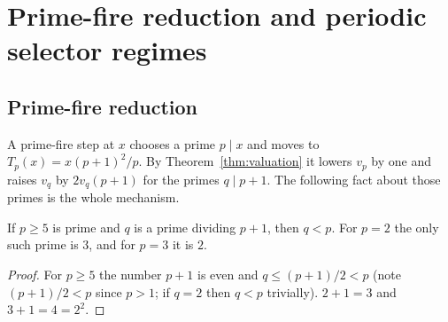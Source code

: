
\section{Prime-fire reduction and periodic selector regimes}\label{sec:fire}
\subsection{Prime-fire reduction}
A prime-fire step at $x$ chooses a prime $p\mid x$ and moves to $T_p(x)=x(p+1)^2/p$. By Theorem~\ref{thm:valuation} it lowers $v_p$ by one and raises $v_q$ by $2v_q(p+1)$ for the primes $q\mid p+1$. The following fact about those primes is the whole mechanism.
\begin{lemma}[Primes of $p+1$]\label{lem:pplus1}
If $p\ge5$ is prime and $q$ is a prime dividing $p+1$, then $q<p$. For $p=2$ the only such prime is $3$, and for $p=3$ it is $2$.
\end{lemma}
\begin{proof} For $p\ge5$ the number $p+1$ is even and $q\le(p+1)/2<p$ (note $(p+1)/2<p$ since $p>1$; if $q=2$ then $q<p$ trivially). $2+1=3$ and $3+1=4=2^2$. \end{proof}

